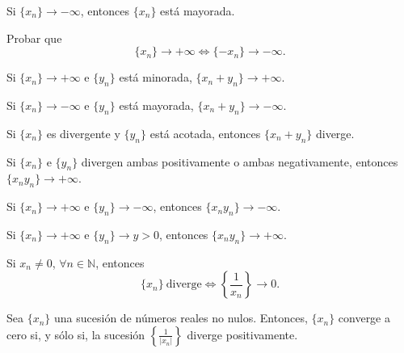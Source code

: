 \begin{ejercicio}
    Si $\{x_n\} \longrightarrow -\infty$, entonces $\{x_n\}$ está mayorada.
\end{ejercicio}

\begin{ejercicio}
    Probar que
    \begin{equation*}
        \{x_n\} \longrightarrow + \infty \Longleftrightarrow \{-x_n\} \longrightarrow -\infty.
    \end{equation*}
\end{ejercicio}

\begin{ejercicio}\label{ej:7.2.4}
    Si $\{x_n\} \longrightarrow + \infty$ e $\{y_n\}$ está minorada, $\{x_n+y_n\} \longrightarrow + \infty$.
\end{ejercicio}

\begin{ejercicio}
    Si $\{x_n\} \longrightarrow - \infty$ e $\{y_n\}$ está mayorada, $\{x_n+y_n\} \longrightarrow - \infty$.
\end{ejercicio}

\begin{ejercicio}
    Si $\{x_n\}$ es divergente y $\{y_n\}$ está acotada, entonces $\{x_n + y_n\}$ diverge.
\end{ejercicio}

\begin{ejercicio}\label{ej:7.2.7}
    Si $\{x_n\}$ e $\{y_n\}$ divergen ambas positivamente o ambas negativamente, entonces $\{x_n y_n\} \longrightarrow +\infty$.
\end{ejercicio}

\begin{ejercicio}\label{ej:7.2.8}
    Si $\{x_n\} \longrightarrow +\infty$ e $\{y_n\} \longrightarrow -\infty$, entonces $\{x_n y_n\} \longrightarrow -\infty$.
\end{ejercicio}

\begin{ejercicio}\label{ej:7.2.9}
    Si $\{x_n\} \longrightarrow +\infty$ e $\{y_n\} \longrightarrow y > 0$, entonces $\{x_n y_n\} \longrightarrow +\infty$.
\end{ejercicio}

\begin{ejercicio}
    Si $x_n \neq 0$, $\forall n \in \mathbb{N}$, entonces
    \begin{equation*}
        \{x_n\} ~ \text{diverge} \Longleftrightarrow \left\{\frac{1}{x_n}\right\} \longrightarrow 0.
    \end{equation*}
\end{ejercicio}

\begin{ejercicio}\label{ej:7.2.11}
    Sea $\{x_n\}$ una sucesión de números reales no nulos. Entonces, $\{x_n\}$ converge a cero si, y sólo si, la sucesión $\left\{ \frac{1}{|x_n|} \right\}$ diverge positivamente.
\end{ejercicio}
